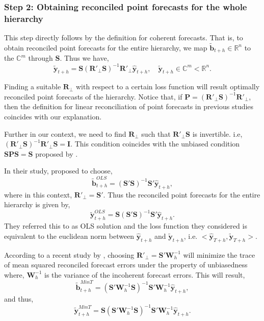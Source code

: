 \documentclass[a4paper, 11pt]{article}
\begin{document}
\subsubsection*{Step 2: Obtaining reconciled point forecasts for the whole hierarchy}

This step directly follows by the definition for coherent forecasts. That is, to obtain reconciled point forecasts for the entire hierarchy, we map $\tilde{\bm{b}}_{t+h} \in \bm{\mathbb{R}}^n$ to the $\bm{\mathbb{C}}^m$ through $\bm{S}$. Thus we have, 
\begin{equation}
\tilde{\bm{y}}_{t+h}=\bm{S}(\bm{R}'_\bot \bm{S})^{-1}\bm{R}'_\bot \hat{\bm{y}}_{t+h}, \quad \tilde{\bm{y}}_{t+h} \in \bm{\mathbb{C}}^m<\bm{\mathbb{R}}^n.
\end{equation}

Finding a suitable $\bm{R}_\bot$ with respect to a certain loss function will result optimally reconciled point forecasts of the hierarchy. Notice that, if $\bm{P}=(\bm{R}'_\bot \bm{S})^{-1}\bm{R}'_\bot$, then the definition for linear reconciliation of point forecasts in previous studies coincides with our explanation.

Further in our context, we need to find $\bm{R}_\bot$ such that $\bm{R}'_\bot \bm{S}$ is invertible. i.e, $(\bm{R}'_\bot \bm{S})^{-1}\bm{R}'_\bot \bm{S}=\bm{I}$. This condition coincides with the unbiased condition $\bm{SPS}=\bm{S}$ proposed by \citet{Hyndman2011}.

In their study, \citet{Hyndman2011} proposed to choose,
\begin{equation*}
\tilde{\bm{b}}^{OLS}_{t+h}=(\bm{S}' \bm{S})^{-1}\bm{S}' \hat{\bm{y}}_{t+h},
\end{equation*}
where in this context, $\bm{R}'_\bot = \bm{S}'$. Thus the reconciled point forecasts for the entire hierarchy is given by,
\begin{equation}
\tilde{\bm{y}}^{OLS}_{t+h}=\bm{S}(\bm{S}' \bm{S})^{-1}\bm{S}' \hat{\bm{y}}_{t+h}.
\end{equation}
They referred this to as OLS solution and the loss function they considered is equivalent to the euclidean norm between $\hat{\bm{y}}_{t+h}$ and $\tilde{\bm{y}}_{t+h}$, i.e. $<\hat{\bm{y}}_{T+h}, \tilde{\bm{y}}_{T+h}>$.

According to a recent study by \citet{Wickramasuriya2017}, choosing $\bm{R}'_\bot = \bm{S}'\bm{W}^{-1}_{h}$ will minimize the trace of mean squared reconciled forecast errors under the property of unbiasedness where, $\bm{W}^{-1}_{h}$ is the variance of the incoherent forecast errors. This will result,
\begin{equation*}
\tilde{\bm{b}}^{MinT}_{t+h}=(\bm{S}'\bm{W}^{-1}_{h} \bm{S})^{-1}\bm{S}'\bm{W}^{-1}_{h} \hat{\bm{y}}_{t+h},
\end{equation*}
and thus,
\begin{equation}
\tilde{\bm{y}}^{MinT}_{t+h}=\bm{S}(\bm{S}' \bm{W}^{-1}_{h}\bm{S})^{-1}\bm{S}'\bm{W}^{-1}_{h} \hat{\bm{y}}_{t+h}.
\end{equation}
\end{document}
